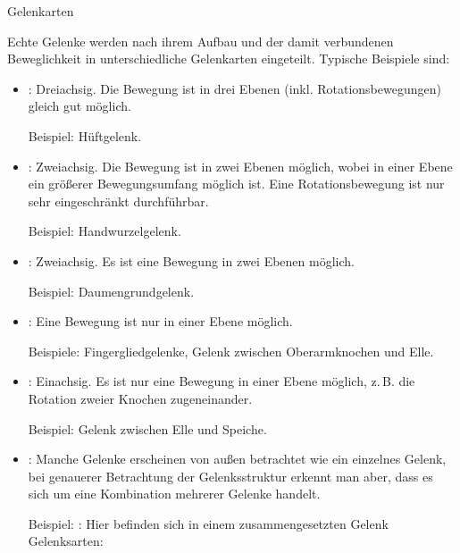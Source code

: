 \TextSlide
{Gelenkarten}%
{%
%
%
%
%
%
%
Echte Gelenke werden nach ihrem Aufbau
und der damit verbundenen Beweglichkeit in unterschiedliche Gelenkarten 
eingeteilt.
%
Typische Beispiele sind:
\begin{itemize}
  \item {}: 
  Dreiachsig. 
  Die Bewegung ist in drei Ebenen 
  (inkl. Rotationsbewegungen)
  gleich gut möglich.
  
  Beispiel: Hüftgelenk.
  \item {}: 
  Zweiachsig.
  Die Bewegung ist in zwei Ebenen möglich, 
  wobei in einer Ebene ein größerer Bewegungsumfang möglich ist. 
  Eine Rotationsbewegung ist nur sehr eingeschränkt durchführbar.
   
  Beispiel: Handwurzelgelenk.
  \item {}: 
  Zweiachsig.
  Es ist eine Bewegung in zwei Ebenen möglich.
  
  Beispiel: Daumengrundgelenk.
  \item {}: 
  Eine Bewegung ist nur in einer Ebene möglich.
  
  Beispiele: Fingergliedgelenke, Gelenk zwischen
  Oberarmknochen und Elle.
  \item {}: 
  Einachsig.
  Es ist nur eine Bewegung in einer Ebene möglich, 
  z.\,B. die Rotation zweier Knochen zugeneinander.
  
  Beispiel: Gelenk zwischen Elle und Speiche.
  \item {}: 
  Manche Gelenke erscheinen von außen betrachtet wie ein einzelnes Gelenk, 
  bei genauerer Betrachtung der Gelenksstruktur erkennt man aber, 
  dass es sich um eine Kombination mehrerer Gelenke handelt.
  
  Beispiel: : 
  Hier befinden sich in einem zusammengesetzten Gelenk  Gelenksarten:
\end{itemize} 

}%
